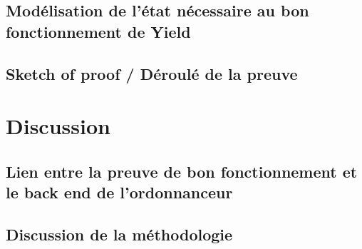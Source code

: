 		\subsection{Modélisation de l'état nécessaire au bon fonctionnement de Yield}
		\subsection{Sketch of proof / Déroulé de la preuve}

	\section{Discussion}
		\subsection{Lien entre la preuve de bon fonctionnement et le back end de l'ordonnanceur}
		\subsection{Discussion de la méthodologie}
